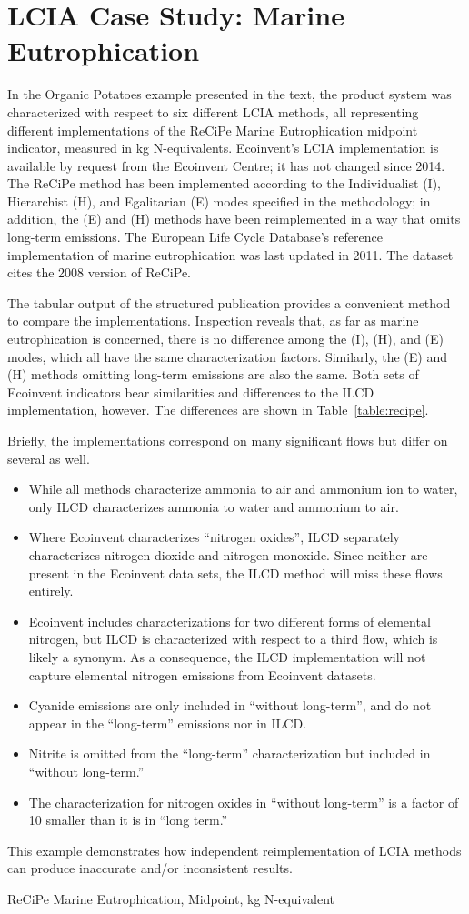 \section{LCIA Case Study: Marine Eutrophication}

In the Organic Potatoes example presented in the text, the product system was characterized with respect to six different LCIA methods, all representing different implementations of the ReCiPe Marine Eutrophication midpoint indicator, measured in kg N-equivalents.  Ecoinvent's LCIA implementation is available by request from the Ecoinvent Centre; it has not changed since 2014. The ReCiPe method has been implemented according to the Individualist (I), Hierarchist (H), and Egalitarian (E) modes specified in the methodology; in addition, the (E) and (H) methods have been reimplemented in a way that omits long-term emissions.  The European Life Cycle Database's reference implementation of marine eutrophication was last updated in 2011.  The dataset cites the 2008 version of ReCiPe.

The tabular output of the structured publication provides a convenient method to compare the implementations. Inspection reveals that, as far as marine eutrophication  is concerned, there is no difference among the (I), (H), and (E) modes, which all have the same characterization factors.  Similarly, the (E) and (H) methods omitting long-term emissions are also the same.  Both sets of Ecoinvent indicators bear similarities and differences to the ILCD implementation, however.  The differences are shown in Table~\ref{table:recipe}.

Briefly, the implementations correspond on many significant flows but differ on several as well.
\begin{itemize}
\item While all methods characterize ammonia to air and ammonium ion to water, only ILCD characterizes ammonia to water and ammonium to air.
\item Where Ecoinvent characterizes ``nitrogen oxides'', ILCD separately characterizes nitrogen dioxide and nitrogen monoxide.  Since neither are present in the Ecoinvent data sets, the ILCD method will miss these flows entirely.
\item Ecoinvent includes characterizations for two different forms of elemental nitrogen, but ILCD is characterized with respect to a third flow, which is likely a synonym.  As a consequence, the ILCD implementation will not capture elemental nitrogen emissions from Ecoinvent datasets.
\item Cyanide emissions are only included in ``without long-term'', and do not appear in the ``long-term'' emissions nor in ILCD.
\item Nitrite is omitted from the ``long-term'' characterization but included in ``without long-term.''
\item The characterization for nitrogen oxides in ``without long-term'' is a factor of 10 smaller than it is in ``long term.''
\end{itemize}
This example demonstrates how independent reimplementation of LCIA methods can produce inaccurate and/or inconsistent results.

\begin{table}
  \footnotesize\sffamily
  \caption{ReCiPe Marine Eutrophication, Midpoint, kg N-equivalent}
  
\end{table}

